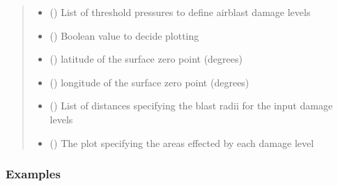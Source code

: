 \documentclass[letterpaper,10pt,english]{sphinxmanual}
\begin{document}
\begin{fulllineitems}
\begin{quote}
\begin{description}
\begin{itemize}
\item {} 
\sphinxAtStartPar
{} (\sphinxstyleliteralemphasis{\sphinxupquote{, }}) \textendash{} List of threshold pressures to define airblast damage levels

\item {} 
\sphinxAtStartPar
{} () \textendash{} Boolean value to decide plotting

\end{itemize}

\sphinxAtStartPar
\begin{itemize}
\item {} 
\sphinxAtStartPar
{} () \textendash{} latitude of the surface zero point (degrees)

\item {} 
\sphinxAtStartPar
{} () \textendash{} longitude of the surface zero point (degrees)

\item {} 
\sphinxAtStartPar
{} () \textendash{} List of distances specifying the blast radii
for the input damage levels

\item {} 
\sphinxAtStartPar
{} () \textendash{} The plot specifying the areas effected by
each damage level

\end{itemize}


\end{description}\end{quote}
\subsubsection*{Examples}


\end{fulllineitems}
\end{document}
